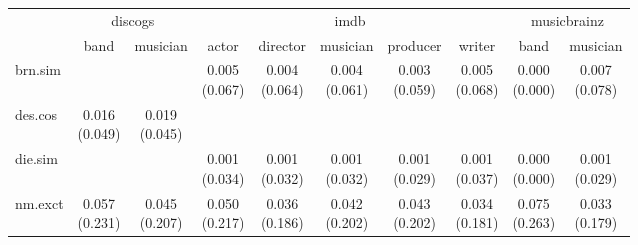 \documentclass[epsfig,a4paper,11pt,titlepage,twoside,openany]{book}
\begin{document}
\begin{table}[H]
\centering
\begin{tabular}{l|c|c|c|c|c|c|c|c|c|}
\cline{2-10}
                                                           & \multicolumn{2}{c|}{discogs} & \multicolumn{5}{c|}{imdb}                                                & \multicolumn{2}{c|}{musicbrainz} \\ \cline{2-10} 
                                                           & band          & musician     & actor        & director     & musician     & producer     & writer       & band            & musician       \\ \hline
\multicolumn{1}{|l|}{brn.sim}                        &               &              & \makecell{0.005 \\ (0.067)} & \makecell{0.004 \\ (0.064)} & \makecell{0.004 \\ (0.061)} & \makecell{0.003 \\ (0.059)} & \makecell{0.005 \\ (0.068)} & \makecell{0.000 \\ (0.000)}    & \makecell{0.007 \\ (0.078)}   \\ \hline
\multicolumn{1}{|l|}{des.cos}                  & \makecell{0.016 \\ (0.049)}  & \makecell{0.019 \\ (0.045)} &              &              &              &              &              &                 &                \\ \hline
\multicolumn{1}{|l|}{die.sim}                        &               &              & \makecell{0.001 \\ (0.034)} & \makecell{0.001 \\ (0.032)} & \makecell{0.001 \\ (0.032)} & \makecell{0.001 \\ (0.029)} & \makecell{0.001 \\ (0.037)} & \makecell{0.000 \\ (0.000)}    & \makecell{0.001 \\ (0.029)}   \\ \hline
\multicolumn{1}{|l|}{nm.exct}                          & \makecell{0.057 \\ (0.231)}  & \makecell{0.045 \\ (0.207)} & \makecell{0.050 \\ (0.217)} & \makecell{0.036 \\ (0.186)} & \makecell{0.042 \\ (0.202)} & \makecell{0.043 \\ (0.202)} & \makecell{0.034 \\ (0.181)} & \makecell{0.075 \\ (0.263)}    & \makecell{0.033 \\ (0.179)}   \\ \hline

\end{tabular}
\end{table}
\end{document}
